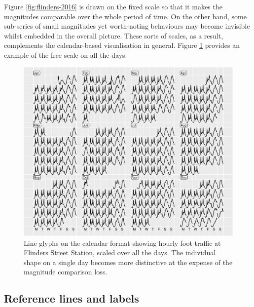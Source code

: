 \documentclass[article]{jss}
\begin{document}
Figure \ref{fig:flinders-2016} is drawn on the fixed scale so that it
makes the magnitudes comparable over the whole period of time. On the
other hand, some sub-series of small magnitudes yet worth-noting
behaviours may become invisible whilst embedded in the overall picture.
These sorts of scales, as a result, complements the calendar-based
visualisation in general. Figure \ref{fig:flinders-free} provides an
example of the free scale on all the days.

\begin{CodeChunk}
\begin{figure}

{\centering \includegraphics[width=\textwidth]{figure/flinders-free-1} 

}

\caption[Line glyphs on the calendar format showing hourly foot traffic at Flinders Street Station, scaled over all the days]{Line glyphs on the calendar format showing hourly foot traffic at Flinders Street Station, scaled over all the days. The individual shape on a single day becomes more distinctive at the expense of the magnitude comparison loss.}\label{fig:flinders-free}
\end{figure}
\end{CodeChunk}

\subsection{Reference lines and
labels}\label{reference-lines-and-labels}
\end{document}
